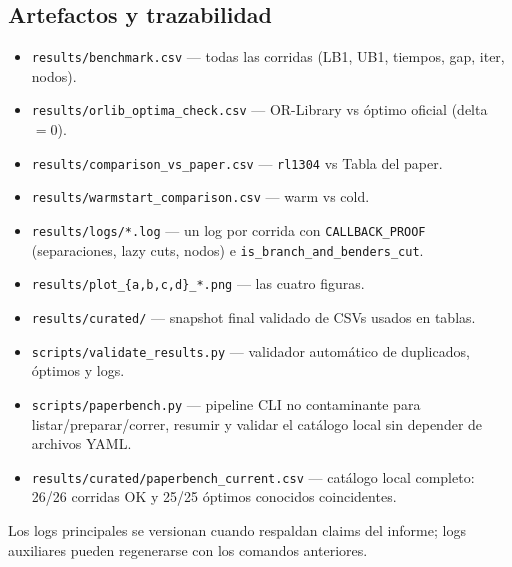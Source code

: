\subsection{Artefactos y trazabilidad}
\begin{itemize}[noitemsep]
  \item \texttt{results/benchmark.csv} — todas las corridas (LB1, UB1, tiempos, gap, iter, nodos).
  \item \texttt{results/orlib\_optima\_check.csv} — OR-Library vs óptimo oficial (delta$=0$).
  \item \texttt{results/comparison\_vs\_paper.csv} — \texttt{rl1304} vs Tabla del paper.
  \item \texttt{results/warmstart\_comparison.csv} — warm vs cold.
  \item \texttt{results/logs/*.log} — un log por corrida con \texttt{CALLBACK\_PROOF} (separaciones,
        lazy cuts, nodos) e \texttt{is\_branch\_and\_benders\_cut}.
  \item \texttt{results/plot\_\{a,b,c,d\}\_*.png} — las cuatro figuras.
  \item \texttt{results/curated/} — snapshot final validado de CSVs usados en tablas.
  \item \texttt{scripts/validate\_results.py} — validador automático de duplicados, óptimos y logs.
  \item \texttt{scripts/paperbench.py} — pipeline CLI no contaminante para listar/preparar/correr,
        resumir y validar el catálogo local sin depender de archivos YAML.
  \item \texttt{results/curated/paperbench\_current.csv} — catálogo local completo: 26/26 corridas
        OK y 25/25 óptimos conocidos coincidentes.
\end{itemize}
Los logs principales se versionan cuando respaldan claims del informe; logs auxiliares pueden
regenerarse con los comandos anteriores.

